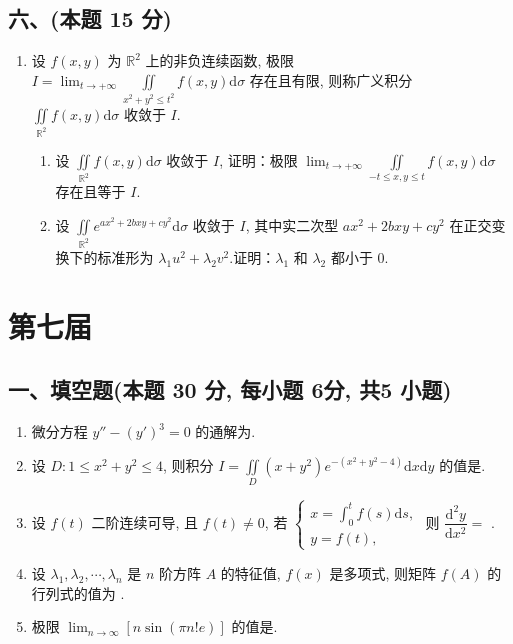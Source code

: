 \subsection*{六、(本题 15 分)}
\begin{enumerate}[start=11]
    \item 设 $f(x, y)$ 为 $\mathbb{R}^2$ 上的非负连续函数, 极限 $I = \displaystyle\lim_{t \to +\infty} \iint\limits_{x^2 + y^2 \leqslant t^2} f(x, y) \mathrm{d}\sigma$ 存在且有限, 则称广义积分 \\
          $\displaystyle\iint\limits_{\mathbb{R}^2} f(x, y) \mathrm{d}\sigma$ 收敛于 $I$.
          \begin{enumerate}
              \item[(1)] 设 $\displaystyle\iint\limits_{\mathbb{R}^2} f(x, y) \mathrm{d}\sigma$ 收敛于 $I$, 证明：极限 $\displaystyle\lim_{t \to +\infty} \iint\limits_{-t \leqslant x, y \leqslant t} f(x, y) \mathrm{d}\sigma$ 存在且等于 $I$.
              \item[(2)] 设 $\displaystyle\iint\limits_{\mathbb{R}^2} e^{ax^2 + 2bxy + cy^2} \mathrm{d}\sigma$ 收敛于 $I$, 其中实二次型 $ax^2 + 2bxy + cy^2$ 在正交变换下的标准形为 $\lambda_1 u^2 + \lambda_2 v^2$.证明：$\lambda_1$ 和 $\lambda_2$ 都小于 $0$.
          \end{enumerate}
\end{enumerate}

\newpage
\section{第七届}

\subsection*{一、填空题(本题 30 分,  每小题 6分,  共5 小题)}
\begin{enumerate}
    \item 微分方程 $y'' - (y')^3 = 0$ 的通解为\underline{\quad \quad}.
    \item 设 $D: 1 \leqslant x^2 + y^2 \leqslant 4$, 则积分 $I = \displaystyle\iint\limits_{D} (x + y^2) e^{-(x^2 + y^2 - 4)} \mathrm{d}x \mathrm{d}y$ 的值是\underline{\quad \quad}.
    \item 设 $f(t)$ 二阶连续可导, 且 $f(t) \neq 0$, 若
          $\begin{cases}
                  x = \displaystyle\int_{0}^{t} f(s) \mathrm{d}s, \\
                  y = f(t),
              \end{cases}$
          则 $\dfrac{\mathrm{d}^2 y}{\mathrm{d}x^2} =$ \underline{\quad \quad}.
    \item 设 $\lambda_1, \lambda_2, \cdots, \lambda_n$ 是 $n$ 阶方阵 $A$ 的特征值, $f(x)$ 是多项式, 则矩阵 $f(A)$ 的行列式的值为 \underline{\quad \quad}.
    \item 极限 $\displaystyle\lim_{n \to \infty} [n \sin(\pi n! e)]$ 的值是\underline{\quad \quad}.
\end{enumerate}

